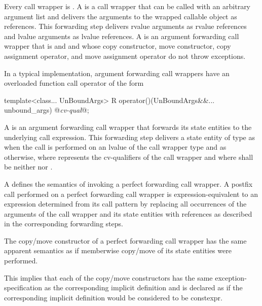 \pnum
{}%
%
%
Every call wrapper is .
A  is a
call wrapper that can be called with an arbitrary argument list
and delivers the arguments to the wrapped callable object as references.
This forwarding step delivers rvalue arguments as rvalue references
and lvalue arguments as lvalue references.
A  is an argument forwarding call wrapper that is
 and  and
whose copy constructor, move constructor, copy assignment operator,
and move assignment operator do not throw exceptions.
\begin{note}
In a typical implementation, argument forwarding call wrappers have
an overloaded function call operator of the form
\begin{codeblock}
template<class... UnBoundArgs>
  R operator()(UnBoundArgs&&... unbound_args) @\textit{cv-qual}@;
\end{codeblock}
\end{note}

\pnum
{}%
A  is
an argument forwarding call wrapper
that forwards its state entities to the underlying call expression.
This forwarding step delivers a state entity of type 
as \cv{} 
when the call is performed on an lvalue of the call wrapper type and
as \cv{}  otherwise,
where \cv{} represents the cv-qualifiers of the call wrapper and
where \cv{} shall be neither  nor .

\pnum
A  defines the semantics of invoking
a perfect forwarding call wrapper.
A postfix call performed on a perfect forwarding call wrapper is
expression-equivalent to
an expression  determined from its call pattern 
by replacing all occurrences
of the arguments of the call wrapper and its state entities
with references as described in the corresponding forwarding steps.

\pnum
The copy/move constructor of a perfect forwarding call wrapper has
the same apparent semantics
as if memberwise copy/move of its state entities
were performed.
\begin{note}
This implies that each of the copy/move constructors has
the same exception-specification as
the corresponding implicit definition and is declared as 
if the corresponding implicit definition would be considered to be constexpr.
\end{note}

